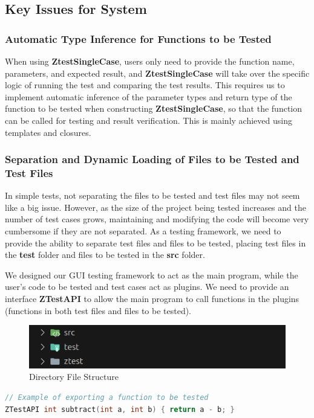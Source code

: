 \documentclass[english]{article}
\begin{document}
\newpage

\subsection{Key Issues for System}
\subsubsection{Automatic Type Inference for Functions to be Tested}
When using \textbf{ZtestSingleCase}, users only need to provide the function name, parameters, and expected result, and \textbf{ZtestSingleCase} will take over the specific logic of running the test and comparing the test results. This requires us to implement automatic inference of the parameter types and return type of the function to be tested when constructing \textbf{ZtestSingleCase}, so that the function can be called for testing and result verification. This is mainly achieved using templates and closures.
\subsubsection{Separation and Dynamic Loading of Files to be Tested and Test Files}
In simple tests, not separating the files to be tested and test files may not seem like a big issue. However, as the size of the project being tested increases and the number of test cases grows, maintaining and modifying the code will become very cumbersome if they are not separated. As a testing framework, we need to provide the ability to separate test files and files to be tested, placing test files in the \textbf{test} folder and files to be tested in the \textbf{src} folder.

We designed our GUI testing framework to act as the main program, while the user's code to be tested and test cases act as plugins. We need to provide an interface \textbf{ZTestAPI} to allow the main program to call functions in the plugins (functions in both test files and files to be tested).
\begin{figure}[H]
    \centering
    \includegraphics[width=\textwidth]{img/file.png} %
    \caption{ Directory File Structure}
    \label{fig:diagram}
\end{figure}
\begin{lstlisting}[language=C++]
// Example of exporting a function to be tested
ZTestAPI int subtract(int a, int b) { return a - b; }
\end{lstlisting}
\end{document}
